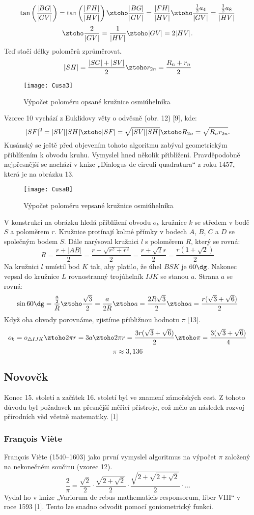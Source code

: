 \documentclass[soc]{gzwroc} %
\begin{document}
$$
\tan\left(\frac{|BG|}{|GV|}\right)=\tan\left(\frac{|FH|}{|HV|}\right) \ztoho \frac{|BG|}{|GV|}=\frac{|FH|}{|HV|} \ztoho \frac{\frac{1}{2}a_4}{|GV|}=\frac{\frac{1}{2}a_8}{|HV|}
$$
$$
\ztoho \frac{2}{|GV|}=\frac{1}{|HV|} \ztoho |GV|=2|HV|.
$$
Teď stačí délky poloměrů zprůměrovat.
$$
|SH|=\frac{|SG|+|SV|}{2} \ztoho r_{2n}=\frac{R_n+r_n}{2}
$$
\begin{figure}[!ht]
\texttt{[image: Cusa3]}
\caption{Výpočet poloměru opsané kružnice osmiúhelníka}
\label{fig:kruh}
\end{figure}
Vzorec 10 vychází z Euklidovy věty o odvěsně (obr. 12) [9], kde:
$$
|SF|^2=|SV||SH| \ztoho |SF|=\sqrt{|SV||SH|} \ztoho R_{2n}=\sqrt{R_nr_{2n}}.
$$
Kusánský se ještě před objevením tohoto algoritmu zabýval geometrickým přiblížením k obvodu kruhu. Vymyslel hned několik přiblížení. Pravděpodobně nejpřesnější se nachází v knize „Dialogus de circuli quadratura“ z roku 1457, která je na obrázku 13.
\begin{figure}[!ht]
\texttt{[image: CusaB]}
\caption{Výpočet poloměru vepsané kružnice osmiúhelníka}
\label{fig:kruh}
\end{figure}
V konstrukci na obrázku hledá přiblížení obvodu $o_k$ kružnice $k$ se středem v bodě $S$ a poloměrem $r$. Kružnice protínají kolmé přímky v bodech $A$, $B$, $C$ a $D$ se společným bodem $S$. Dále narýsoval kružnici $l$ s poloměrem $R$, který se rovná:
$$
R=\frac{r+|AB|}{2}=\frac{r+\sqrt{r^2+r^2}}{2}=\frac{r+\sqrt{2}r}{2}=\frac{r(1+\sqrt{2})}{2}
$$
Na kružnici $l$ umístil bod $K$ tak, aby platilo, že úhel $BSK$ je $60\dg$. Nakonec vepsal do kružnice $L$ rovnostranný trojúhelník $IJK$ se stanou $a$. Strana $a$ se rovná:
$$
\sin 60\dg =\frac{\frac{a}{2}}{R} \ztoho \frac{\sqrt{3}}{2}= \frac{a}{2R} \ztoho a= \frac{2R\sqrt{3}}{2} \ztoho a= \frac{r(\sqrt{3}+\sqrt{6})}{2}
$$
Když oba obvody porovnáme, zjistíme přibližnou hodnotu $\pi$ [13].
$$
o_k=o_{\triangle IJK} \ztoho 2\pi r=3a \ztoho 2\pi r= \frac{3r(\sqrt{3}+\sqrt{6})}{2} \ztoho \pi= \frac{3(\sqrt{3}+\sqrt{6})}{4}
$$
$$
\pi \approx 3,136
$$
\subsection{Novověk}
Konec 15. století a začátek 16. století byl ve znamení zámořských cest. Z tohoto důvodu byl požadavek na přesnější měřicí přístroje, což mělo za následek rozvoj přírodních věd včetně matematiky. [1]
\subsubsection{François Viète}
François Viète (1540–1603) jako první vymyslel algoritmus na výpočet $\pi$ založený na nekonečném součinu (vzorec 12).
\begin{equation}
\frac{2}{\pi}=\frac{\sqrt{2}}{2}\cdot\frac{\sqrt{2+\sqrt{2}}}{2}\cdot\frac{\sqrt{2+\sqrt{2+\sqrt{2}}}}{2}\cdot ...
\end{equation}
Vydal ho v knize „Variorum de rebus mathematicis responsorum, liber VIII“ v roce 1593 [1]. Tento lze snadno odvodit pomocí goniometrický funkcí.
\end{document}
